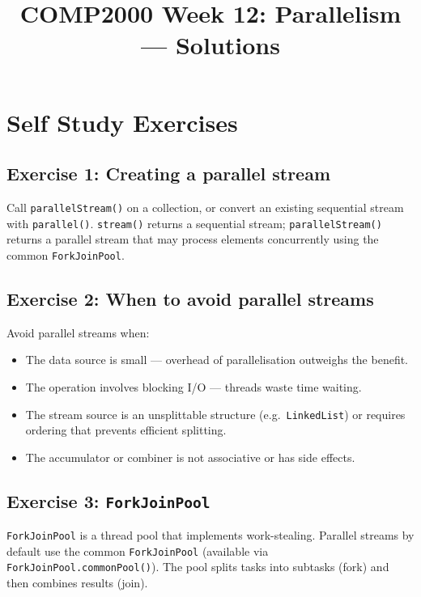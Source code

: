 \documentclass[twoside=false,DIV=14]{scrartcl}
\title{\color{redish} \vspace{-1em}COMP2000 Week 12: Parallelism --- Solutions}
\begin{document}
{\color{blackish}\maketitle}\vspace{-7em}

\section*{Self Study Exercises}

\subsection*{Exercise 1: Creating a parallel stream}

Call \texttt{parallelStream()} on a collection, or convert an existing sequential stream with \texttt{parallel()}.  \texttt{stream()} returns a sequential stream; \texttt{parallelStream()} returns a parallel stream that may process elements concurrently using the common \texttt{ForkJoinPool}.

\subsection*{Exercise 2: When to avoid parallel streams}

Avoid parallel streams when:
\begin{itemize}
    \item The data source is small --- overhead of parallelisation outweighs the benefit.
    \item The operation involves blocking I/O --- threads waste time waiting.
    \item The stream source is an unsplittable structure (e.g.\ \texttt{LinkedList}) or requires ordering that prevents efficient splitting.
    \item The accumulator or combiner is not associative or has side effects.
\end{itemize}

\subsection*{Exercise 3: \texttt{ForkJoinPool}}

\texttt{ForkJoinPool} is a thread pool that implements work-stealing.  Parallel streams by default use the common \texttt{ForkJoinPool} (available via \texttt{ForkJoinPool.commonPool()}).  The pool splits tasks into subtasks (fork) and then combines results (join).
\end{document}
